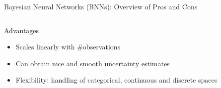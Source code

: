 \begin{frame}[c]{Bayesian Neural Networks (BNNs): Overview of Pros and Cons}

\begin{columns}[T] %
\begin{column}{.48\textwidth}

    \begin{block}{Advantages}
    \begin{itemize}
        \item Scales linearly with \#observations 
        \item Can obtain nice and smooth uncertainty estimates 
        \item Flexibility: handling of categorical, continuous and discrete spaces
    \end{itemize}
    \end{block}

\end{column}%

\hfill%

\begin{column}{.48\textwidth}
\end{column}
\end{columns}

\end{frame}
